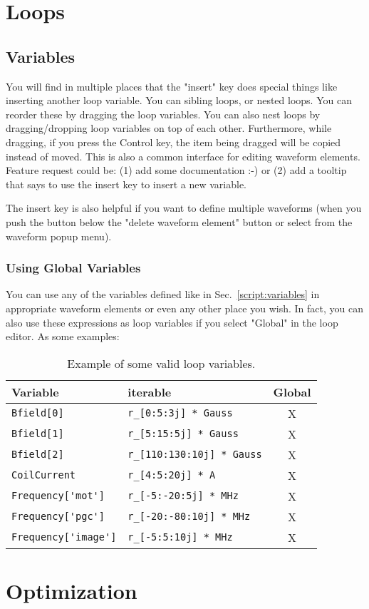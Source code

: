 \section{Loops}
  \subsection{Variables}

  You will find in multiple places that the "insert" key does special things
  like inserting another loop variable.  You can sibling loops, or nested loops.
  You can reorder these by dragging the loop variables.  You can also nest loops
  by dragging/dropping loop variables on top of each other.  Furthermore, while
  dragging, if you press the Control key, the item being dragged will be copied
  instead of moved.  This is also a common interface for editing waveform
  elements.
  Feature request could be:  (1) add some documentation :-) or (2) add a tooltip
  that says to use the insert key to insert a new variable. 



  The insert key is also helpful if you want to define multiple waveforms (when
  you push the button below the "delete waveform element" button or select from
  the waveform popup menu).


  \subsubsection{Using Global Variables}
  You can use any of the variables defined like in Sec.~\ref{script:variables}
  in appropriate waveform elements or even any other place you wish.  In fact,
  you can also use these expressions as loop variables if you select "Global" in
  the loop editor.  As some examples:

  \begin{table}[ht!]
    \center
    \begin{tabular}{p{5cm} m{6cm}c}
    Variable                  &                iterable            &   Global\\
    \hline \hline
    \verb|Bfield[0]|          &       \verb|r_[0:5:3j] * Gauss|      &    X \\
    \verb|Bfield[1]|          &       \verb|r_[5:15:5j] * Gauss|     &    X \\
    \verb|Bfield[2]|          &       \verb|r_[110:130:10j] * Gauss| &    X \\
    \verb|CoilCurrent|        &       \verb|r_[4:5:20j] * A|         &    X \\
    \verb|Frequency['mot']|   &       \verb|r_[-5:-20:5j] * MHz|   &      X \\
    \verb|Frequency['pgc']|   &       \verb|r_[-20:-80:10j] * MHz| &      X \\
    \verb|Frequency['image']| &       \verb|r_[-5:5:10j] * MHz|    &      X \\
    \end{tabular}

    \caption{
      Example of some valid loop variables.
    }
  \end{table}




\section{Optimization}
